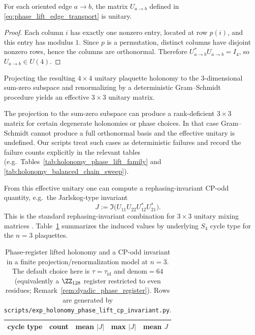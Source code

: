 \begin{lemma}\label{lem:phase_lift_edge_unitary}
For each oriented edge $a\to b$, the matrix $U_{a\to b}$ defined in \eqref{eq:phase_lift_edge_transport} is unitary.
\end{lemma}
\begin{proof}
Each column $i$ has exactly one nonzero entry, located at row $p(i)$, and this entry has modulus $1$.
Since $p$ is a permutation, distinct columns have disjoint nonzero rows, hence the columns are orthonormal.
Therefore $U_{a\to b}^\ast U_{a\to b}=I_4$, so $U_{a\to b}\in U(4)$.
\end{proof}

Projecting the resulting $4\times 4$ unitary plaquette holonomy to the $3$-dimensional sum-zero subspace and renormalizing by a deterministic Gram--Schmidt procedure yields an effective $3\times 3$ unitary matrix.
\begin{remark}\label{rem:gram_schmidt_failures}
The projection to the sum-zero subspace can produce a rank-deficient $3\times 3$ matrix for certain degenerate holonomies or phase choices.
In that case Gram--Schmidt cannot produce a full orthonormal basis and the effective unitary is undefined.
Our scripts treat such cases as deterministic failures and record the failure counts explicitly in the relevant tables (e.g.\ Tables~\ref{tab:holonomy_phase_lift_family} and \ref{tab:holonomy_balanced_chain_sweep}).
\end{remark}
From this effective unitary one can compute a rephasing-invariant CP-odd quantity, e.g.\ the Jarlskog-type invariant
\[
J:=\Im\!\bigl(U_{11}U_{22}U_{12}^\ast U_{21}^\ast\bigr).
\]
This is the standard rephasing-invariant combination for $3\times 3$ unitary mixing matrices \cite{Jarlskog1985,PDGRPP2024}.
Table~\ref{tab:holonomy_phase_lift_j} summarizes the induced values by underlying $S_4$ cycle type for the $n=3$ plaquettes.

\begin{table}[t]
\centering
\small
\setlength{\tabcolsep}{10pt}
\renewcommand{\arraystretch}{1.15}
\begin{tabular}{lrrrr}
\toprule
cycle type & count & mean $|J|$ & max $|J|$ & mean $J$ \\
\midrule
%
\end{tabular}
\caption{Phase-register lifted holonomy and a CP-odd invariant in a finite projection/renormalization model at $n=3$. The default choice here is $\tau=\tau_{\mathrm{id}}$ and $\mathrm{denom}=64$ (equivalently a $\ZZ_{128}$ register restricted to even residues; Remark~\ref{rem:dyadic_phase_register}). Rows are generated by \texttt{scripts/exp\_holonomy\_phase\_lift\_cp\_invariant.py}.}
\label{tab:holonomy_phase_lift_j}
\end{table}

